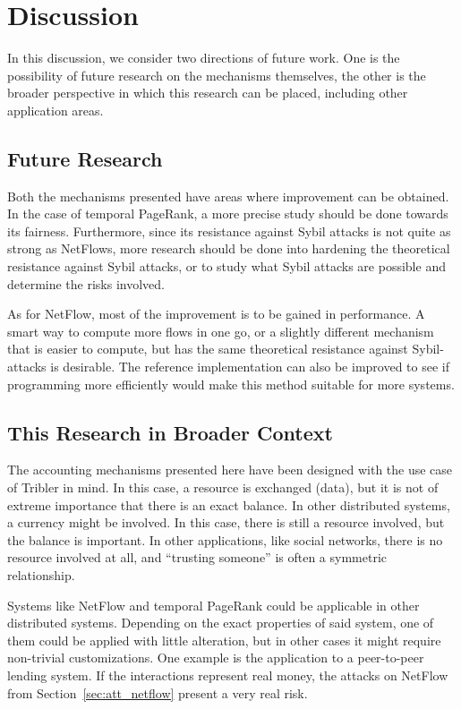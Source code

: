 \documentclass[a4paper,11pt]{book}
\theoremstyle{definition}
\begin{document}
\section{Discussion}

In this discussion, we consider two directions of future work.
One is the possibility of future research on the mechanisms themselves, the other is the broader perspective
in which this research can be placed, including other application areas. 

\subsection{Future Research}

Both the mechanisms presented have areas where improvement can be obtained. In the case of
temporal PageRank, a more precise study should be done towards its fairness. Furthermore,
since its resistance against Sybil attacks is not quite as strong as NetFlows, more research should be done
into hardening the theoretical resistance against Sybil attacks, or to study what Sybil
attacks are possible and determine the risks involved.

As for NetFlow, most of the improvement is to be gained in performance. A smart way
to compute more flows in one go, or a slightly different mechanism that is
easier to compute, but has the same theoretical resistance against Sybil-attacks 
is desirable. The reference implementation can also be improved to see if
programming more efficiently would make this method suitable for more systems.

\subsection{This Research in Broader Context}
The accounting mechanisms presented here have been designed with the use case of
Tribler in mind. In this case, a resource is exchanged (data), but it is not of extreme
importance that there is an exact balance. In other distributed systems, a currency
might be involved. In this case, there is still a resource involved, but the balance
is important. In other applications, like social networks, there is no resource involved
at all, and ``trusting someone'' is often a symmetric relationship. 

Systems like NetFlow and temporal PageRank could be applicable in other distributed
systems. Depending on the exact properties of said system, one of them could be
applied with little alteration, but in other cases it might require non-trivial
customizations. One example is the application to a peer-to-peer lending system.
If the interactions represent real money, the attacks on NetFlow from Section~\ref{sec:att_netflow}
present a very real risk.











\appendix



{}

\end{document}
